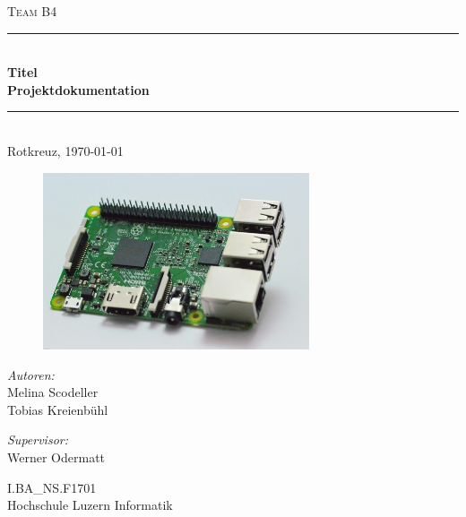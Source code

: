 \begin{titlepage}   

\begin{center}
\textsc{\Large Team B4}\\[0.5cm]

\newcommand{\HRule}{\rule{\linewidth}{0.5mm}}
\HRule \\[0.4cm]
{ \huge \bfseries Titel}\\[0.4cm]
{ \LARGE \bfseries Projektdokumentation}\\[0.4cm]
\HRule \\[1.5cm]

{\large Rotkreuz, \today}

\begin{figure}[H]%
\centering
\includegraphics[width=0.7\textwidth]{Images/Titelbild.jpg}
\label{fig:title}
\end{figure}
\begin{minipage}{0.4\textwidth}
\begin{flushleft} \large
\emph{Autoren:}\\
Melina Scodeller\\
Tobias Kreienbühl\\
\end{flushleft}
\end{minipage}
\hfill
\begin{minipage}{0.4\textwidth}
\begin{flushright} \large
\emph{Supervisor:} \\
Werner Odermatt
\end{flushright}
\end{minipage}
\large
\vfill
I.BA\_NS.F1701 \\
Hochschule Luzern Informatik

\end{center}

\end{titlepage}